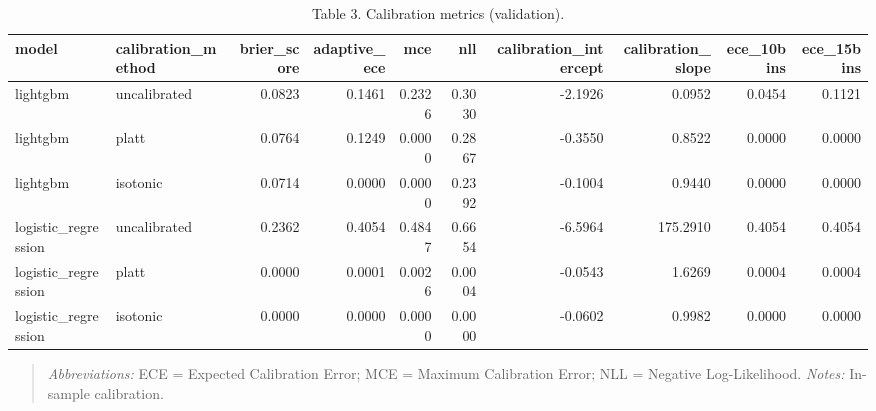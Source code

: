 \begin{table}[htbp]
\centering
\caption{Table 3. Calibration metrics (validation).}
\label{table3_calibration_metrics}
\begin{tabular}{llrrrrrrrr}
\toprule
model & calibration\_method & brier\_score & adaptive\_ece & mce & nll & calibration\_intercept & calibration\_slope & ece\_10bins & ece\_15bins \\
\midrule
lightgbm & uncalibrated & 0.0823 & 0.1461 & 0.2326 & 0.3030 & -2.1926 & 0.0952 & 0.0454 & 0.1121 \\
lightgbm & platt & 0.0764 & 0.1249 & 0.0000 & 0.2867 & -0.3550 & 0.8522 & 0.0000 & 0.0000 \\
lightgbm & isotonic & 0.0714 & 0.0000 & 0.0000 & 0.2392 & -0.1004 & 0.9440 & 0.0000 & 0.0000 \\
logistic\_regression & uncalibrated & 0.2362 & 0.4054 & 0.4847 & 0.6654 & -6.5964 & 175.2910 & 0.4054 & 0.4054 \\
logistic\_regression & platt & 0.0000 & 0.0001 & 0.0026 & 0.0004 & -0.0543 & 1.6269 & 0.0004 & 0.0004 \\
logistic\_regression & isotonic & 0.0000 & 0.0000 & 0.0000 & 0.0000 & -0.0602 & 0.9982 & 0.0000 & 0.0000 \\
\bottomrule
\end{tabular}

\end{table}


\begin{quote}\small
\textit{Abbreviations:} ECE = Expected Calibration Error; MCE = Maximum Calibration Error; NLL = Negative Log-Likelihood.
\textit{Notes:} In-sample calibration.
\end{quote}